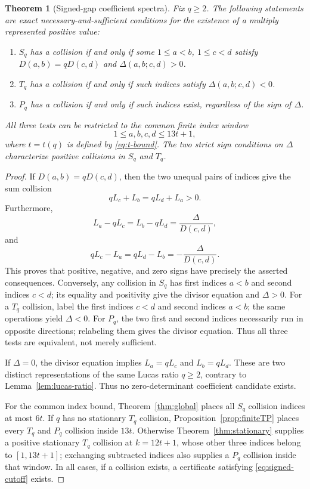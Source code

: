\documentclass[11pt]{article}
\newtheorem{theorem}{Theorem}[section]
\begin{document}
\begin{theorem}[Signed-gap coefficient spectra]
\label{thm:signed-gap}
Fix \(q\ge2\). The following statements are exact
necessary-and-sufficient conditions for the existence
of a multiply represented \emph{positive} value:
\begin{enumerate}
\item \(S_q\) has a collision if and only if some
 \(1\le a<b\), \(1\le c<d\) satisfy
 \(D(a,b)=qD(c,d)\) and \(\Delta(a,b;c,d)>0\).
\item \(T_q\) has a collision if and only if such
 indices satisfy \(\Delta(a,b;c,d)<0\).
\item \(P_q\) has a collision if and only if such
 indices exist, regardless of the sign of \(\Delta\).
\end{enumerate}
All three tests can be restricted to the common finite
index window
\begin{equation}\label{eq:signed-cutoff}
\boxed{1\le a,b,c,d\le 13t+1,}
\end{equation}
where \(t=t(q)\) is defined by \eqref{eq:t-bound}.
The two strict sign conditions on $\Delta$ characterize
positive collisions in $S_q$ and $T_q$.
\end{theorem}
\begin{proof}
If \(D(a,b)=qD(c,d)\), then the two unequal pairs
of indices give the sum collision
\[
qL_c+L_b=qL_d+L_a>0.
\]
Furthermore,
\[
L_a-qL_c=L_b-qL_d=\frac{\Delta}{D(c,d)},
\]
and
\[
qL_c-L_a=qL_d-L_b=-\frac{\Delta}{D(c,d)}.
\]
This proves that positive, negative, and zero signs
have precisely the asserted consequences.
Conversely, any collision in \(S_q\) has first
indices \(a<b\) and second indices \(c<d\);
its equality and positivity give the divisor equation
and \(\Delta>0\). For a \(T_q\) collision, label the
first indices \(c<d\) and second indices \(a<b\);
the same operations yield \(\Delta<0\).
For \(P_q\), the two first and second indices
necessarily run in opposite directions;
relabeling them gives the divisor equation.
Thus all three tests are equivalent, not merely
sufficient.

If \(\Delta=0\), the divisor equation implies
\(L_a=qL_c\) and \(L_b=qL_d\). These are two
distinct representations of the same Lucas ratio
\(q\ge2\), contrary to Lemma~\ref{lem:lucas-ratio}.
Thus no zero-determinant coefficient candidate exists.

For the common index bound, Theorem~\ref{thm:global}
places all \(S_q\) collision indices at most \(6t\).
If \(q\) has no stationary \(T_q\) collision,
Proposition~\ref{prop:finiteTP} places every
\(T_q\) and \(P_q\) collision inside \(13t\).
Otherwise Theorem~\ref{thm:stationary} supplies
a positive stationary \(T_q\) collision at
\(k=12t+1\), whose other three indices belong to
\([1,13t+1]\); exchanging subtracted indices
also supplies a \(P_q\) collision inside that window.
In all cases, if a collision exists, a certificate
satisfying \eqref{eq:signed-cutoff} exists.
\end{proof}
\end{document}
